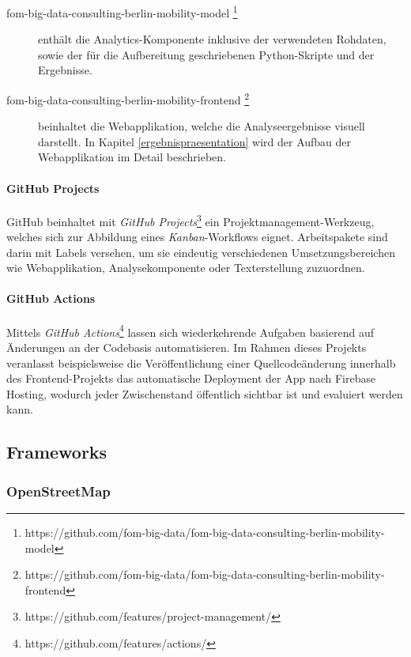 \begin{description}
    \item[fom-big-data-consulting-berlin-mobility-model \footnote{https://github.com/fom-big-data/fom-big-data-consulting-berlin-mobility-model}]enthält die Analytics-Komponente inklusive der verwendeten Rohdaten, sowie der für die Aufbereitung geschriebenen Python-Skripte und der Ergebnisse.
    \item[fom-big-data-consulting-berlin-mobility-frontend \footnote{https://github.com/fom-big-data/fom-big-data-consulting-berlin-mobility-frontend}] beinhaltet die Webapplikation, welche die Analyseergebnisse visuell darstellt. In Kapitel \ref{ergebnispraesentation} wird der Aufbau der Webapplikation im Detail beschrieben.
\end{description}

\paragraph*{GitHub Projects}
\label{github_projects}

GitHub beinhaltet mit \emph{GitHub Projects}\footnote{https://github.com/features/project-management/} ein Projektmanagement-Werkzeug, welches sich zur Abbildung eines \emph{Kanban}-Workflows eignet. Arbeitspakete sind darin mit Labels versehen, um sie eindeutig verschiedenen Umsetzungsbereichen wie Webapplikation, Analysekomponente oder Texterstellung zuzuordnen.

\paragraph*{GitHub Actions}
\label{github_actions}

Mittels \emph{GitHub Actions}\footnote{https://github.com/features/actions/} lassen sich wiederkehrende Aufgaben basierend auf Änderungen an der Codebasis automatisieren. Im Rahmen dieses Projekts veranlasst beispielsweise die Veröffentlichung einer Quellcodeänderung innerhalb des Frontend-Projekts das automatische Deployment der App nach Firebase Hosting, wodurch jeder Zwischenstand öffentlich sichtbar ist und evaluiert werden kann.

\subsection{Frameworks}
\label{frameworks}

\subsubsection{OpenStreetMap}
\label{open_street_map}

